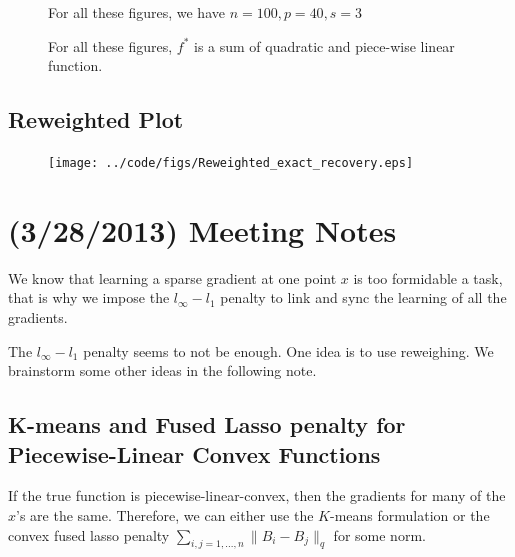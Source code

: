 \documentclass{article}
\begin{document}
\begin{figure}[htp]
\caption{For all these figures, we have $n=100, p=40, s=3$}
\end{figure}


\begin{figure}[htp]
\caption{For all these figures, $f^*$ is a sum of quadratic and piece-wise linear function.}
\end{figure}

\subsection{Reweighted Plot}

\begin{figure}[htp]
\texttt{[image: ../code/figs/Reweighted\_exact\_recovery.eps]}
\end{figure}

\newpage
\section{(3/28/2013) Meeting Notes}

We know that learning a sparse gradient at one point $x$ is too formidable a task, that is why we impose the $l_\infty-l_1$ penalty to link and sync the learning of all the gradients. 

The $l_\infty-l_1$ penalty seems to not be enough. One idea is to use reweighing. We brainstorm some other ideas in the following note. 

\subsection{K-means and Fused Lasso penalty for Piecewise-Linear Convex Functions}

If the true function is piecewise-linear-convex, then the gradients for many of the $x$'s are the same. Therefore, we can either use the $K$-means formulation or the convex fused lasso penalty $\sum_{i,j = 1,...,n} \| B_i - B_j \|_q$ for some norm.
\end{document}

